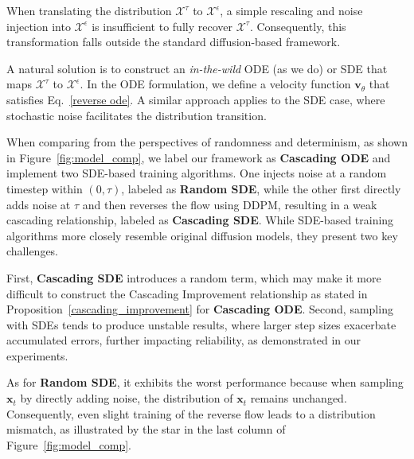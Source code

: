 When translating the distribution $\mathcal{X}^\tau$ to $\mathcal{X}^\epsilon$, a simple rescaling and noise injection into $\mathcal{X}^\epsilon$ is insufficient to fully recover $\mathcal{X}^\tau$. Consequently, this transformation falls outside the standard diffusion-based framework.

A natural solution is to construct an \textit{in-the-wild} ODE (as we do) or SDE that maps $\mathcal{X}^\tau$ to $\mathcal{X}^\epsilon$. In the ODE formulation, we define a velocity function $\mathbf{v}_\theta$ that satisfies Eq.~\eqref{reverse ode}. A similar approach applies to the SDE case, where stochastic noise facilitates the distribution transition.

When comparing from the perspectives of randomness and determinism, as shown in Figure~\ref{fig:model_comp}, we label our framework as \textbf{Cascading ODE} and implement two SDE-based training algorithms. One injects noise at a random timestep within $(0, \tau)$, labeled as \textbf{Random SDE}, while the other first directly adds noise at $\tau$ and then reverses the flow using DDPM, resulting in a weak cascading relationship, labeled as \textbf{Cascading SDE}. While SDE-based training algorithms more closely resemble original diffusion models, they present two key challenges.

First, \textbf{Cascading SDE} introduces a random term, which may make it more difficult to construct the Cascading Improvement relationship as stated in Proposition~\ref{cascading_improvement} for \textbf{Cascading ODE}.
Second, sampling with SDEs tends to produce unstable results, where larger step sizes exacerbate accumulated errors, further impacting reliability, as demonstrated in our experiments.

As for \textbf{Random SDE}, it exhibits the worst performance because when sampling $\mathbf{x}_t$ by directly adding noise, the distribution of $\mathbf{x}_t$ remains unchanged. Consequently, even slight training of the reverse flow leads to a distribution mismatch, as illustrated by the star in the last column of Figure~\ref{fig:model_comp}.

